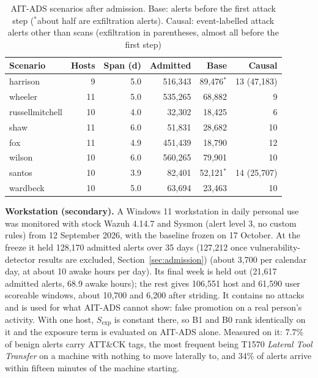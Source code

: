 \documentclass[conference]{IEEEtran}
\begin{document}
\begin{table}[t]
\caption{AIT-ADS scenarios after admission. Base: alerts before the first attack step ($^\ast$about half are exfiltration alerts). Causal: event-labelled attack alerts other than scans (exfiltration in parentheses, almost all before the first step)}
\label{tab:ait}
\centering\footnotesize
\setlength{\tabcolsep}{4.5pt}
\begin{tabular}{@{}lrrrrr@{}}
\toprule
\textbf{Scenario} & \textbf{Hosts} & \textbf{Span (d)} & \textbf{Admitted} & \textbf{Base} & \textbf{Causal} \\
\midrule
harrison & 9 & 5.0 & 516{,}343 & 89{,}476$^\ast$ & 13 (47{,}183) \\
wheeler & 11 & 5.0 & 535{,}265 & 68{,}882 & 9 \\
russellmitchell & 10 & 4.0 & 32{,}302 & 18{,}425 & 6 \\
shaw & 11 & 6.0 & 51{,}831 & 28{,}682 & 10 \\
\midrule
fox & 11 & 4.9 & 451{,}439 & 18{,}790 & 12 \\
wilson & 10 & 6.0 & 560{,}265 & 79{,}901 & 10 \\
santos & 10 & 3.9 & 82{,}401 & 52{,}121$^\ast$ & 14 (25{,}707) \\
wardbeck & 10 & 5.0 & 63{,}694 & 23{,}463 & 10 \\
\bottomrule
\end{tabular}
\end{table}

\textbf{Workstation (secondary).} A Windows 11 workstation in daily personal use was monitored with stock Wazuh 4.14.7 and Sysmon (alert level 3, no custom rules) from 12 September 2026, with the baseline frozen on 17 October. At the freeze it held 128{,}170 admitted alerts over 35 days (127{,}212 once vulnerability-detector results are excluded, Section~\ref{sec:admission}) (about 3{,}700 per calendar day, at about 10 awake hours per day). Its final week is held out (21{,}617 admitted alerts, 68.9 awake hours); the rest gives 106{,}551 host and 61{,}590 user scoreable windows, about 10{,}700 and 6{,}200 after striding. It contains no attacks and is used for what AIT-ADS cannot show: false promotion on a real person's activity. With one host, $S_\mathrm{exp}$ is constant there, so B1 and B0 rank identically on it and the exposure term is evaluated on AIT-ADS alone. Measured on it: 7.7\% of benign alerts carry ATT\&CK tags, the most frequent being T1570 \emph{Lateral Tool Transfer} on a machine with nothing to move laterally to, and 34\% of alerts arrive within fifteen minutes of the machine starting.
\end{document}
